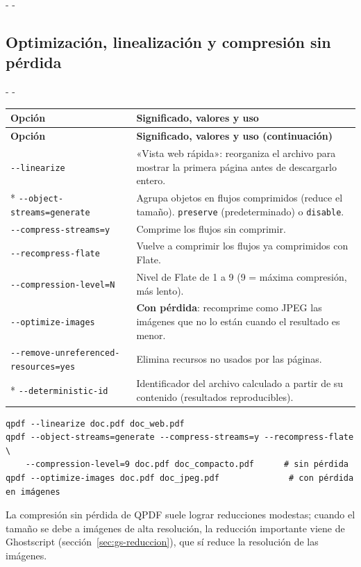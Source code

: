 \documentclass[11pt,a4paper]{article}
\makeatletter
\newcommand{\necesitaespacio}[1]{\par\penalty-100\begingroup
	\setlength{\dimen@}{#1}\dimen@ii\pagegoal\advance\dimen@ii-\pagetotal
	\ifdim\dimen@>\dimen@ii\ifdim\dimen@ii>\z@\vfil\fi\penalty-\@M\fi\endgroup}
\newenvironment{opciones}[1][Opción]{%
	\par\begingroup\small
	\begin{longtable}{L{4.25cm}L{11.2cm}}
		\toprule\rowcolor{tablacab}\cab{#1} & \cab{Significado, valores y uso} \\ \midrule
		\endfirsthead
		\toprule\rowcolor{tablacab}\cab{#1} & \cab{Significado, valores y uso (continuación)} \\ \midrule
		\endhead
		\bottomrule
		\endfoot}
	{\end{longtable}\endgroup}
\newcommand{\opt}[1]{\texttt{\textcolor{colopt}{#1}}}      %
\newcommand{\val}[1]{\texttt{#1}}                          %
\newcommand{\cab}[1]{\textbf{#1}}
\makeatother
\begin{document}
	\necesitaespacio{26\baselineskip}
	\subsection{Optimización, linealización y compresión sin pérdida}
	
	\necesitaespacio{22\baselineskip}
	\begin{opciones}
		\opt{-{}-linearize} & «Vista web rápida»: reorganiza el archivo para mostrar la primera página antes de descargarlo entero.\\*
		\opt{-{}-object-\allowbreak{}streams=\allowbreak{}generate} & Agrupa objetos en flujos comprimidos (reduce el tamaño). \val{preserve} (predeterminado) o \val{disable}.\\
		\opt{-{}-compress-\allowbreak{}streams=\allowbreak{}y} & Comprime los flujos sin comprimir.\\
		\opt{-{}-recompress-\allowbreak{}flate} & Vuelve a comprimir los flujos ya comprimidos con Flate.\\
		\opt{-{}-compression-\allowbreak{}level=\allowbreak{}N} & Nivel de Flate de 1 a 9 (9 = máxima compresión, más lento).\\
		\opt{-{}-optimize-\allowbreak{}images} & \textbf{Con pérdida}: recomprime como JPEG las imágenes que no lo están cuando el resultado es menor.\\
		\opt{-{}-remove-\allowbreak{}unreferenced-\allowbreak{}resources=\allowbreak{}yes} & Elimina recursos no usados por las páginas.\\*
		\opt{-{}-deterministic-\allowbreak{}id} & Identificador del archivo calculado a partir de su contenido (resultados reproducibles).\\
	\end{opciones}
	
	\begin{lstlisting}
qpdf --linearize doc.pdf doc_web.pdf
qpdf --object-streams=generate --compress-streams=y --recompress-flate \
    --compression-level=9 doc.pdf doc_compacto.pdf      # sin pérdida
qpdf --optimize-images doc.pdf doc_jpeg.pdf              # con pérdida en imágenes
\end{lstlisting}
	
	\begin{nota}
		La compresión sin pérdida de QPDF suele lograr reducciones modestas; cuando el tamaño se debe a imágenes de alta resolución, la reducción importante viene de Ghostscript (sección~\ref{sec:gs-reduccion}), que sí reduce la resolución de las imágenes.
	\end{nota}
	
\end{document}
